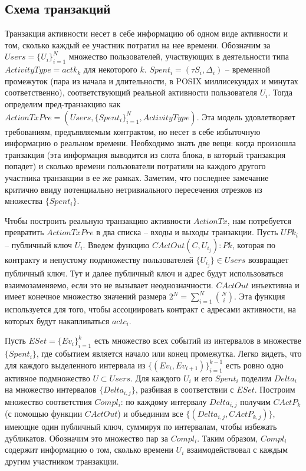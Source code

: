 \documentclass[specification,annotation]{itmo-student-thesis}
\begin{document}
\subsection{Схема транзакций}

Транзакция активности несет в себе информацию об одном виде активности
и том, сколько каждый ее участник потратил на нее времени. Обозначим
за $Users = \{U_i\}_{i=1}^N$ множество пользователей, участвующих в
деятельности типа $ActivityType = actk_k$ для некоторого $k$. $Spent_i
= (\tau S_i, \Delta_i)$ -- временной промежуток (пара из начала и
длительности, в POSIX миллисекундах и минутах соответственно),
соответствующий реальной активности пользователя $U_i$. Тогда
определим пред-транзакцию как $ActionTxPre = (Users,
\{Spent_i\}_{i=1}^N, ActivityType)$. Эта модель удовлетворяет
требованиям, предъявляемым контрактом, но несет в себе избыточную
информацию о реальном времени. Необходимо знать две вещи: когда
произошла транзакция (эта информация выводится из слота блока, в
который транзакция попадет) и сколько времени пользователи потратили
на каждого другого участника транзакции в ее же рамках. Заметим, что
последнее замечание критично ввиду потенциально нетривиального
пересечения отрезков из множества $\{Spent_i\}$.

Чтобы построить реальную транзакцию активности $ActionTx$, нам
потребуется превратить $ActionTxPre$ в два списка -- входы и выходы
транзакции. Пусть $UPk_i$ -- публичный ключ $U_i$. Введем функцию
$CActOut(C, {U_{i_j}}) : Pk$, которая по контракту и непустому
подмножеству пользователей $\{U_{i_j}\} \in Users$ возвращает
публичный ключ. Тут и далее публичный ключ и адрес будут
использоваться взаимозаменяемо, если это не вызывает
неоднозначности. $CActOut$ инъективна и имеет конечное множество
значений размера $2^N = \sum_{i=1}^N{\binom{N}{i}}$. Эта функция
используется для того, чтобы ассоциировать контракт с адресами
активности, на которых будут накапливаться $actc_i$.

Пусть $ESet = \{Ev_i\}_{i=1}^k$ есть множество всех событий из
интервалов в множестве $\{Spent_i\}$, где событием является начало или
конец промежутка. Легко видеть, что для каждого выделенного интервала
из $\{(Ev_i, Ev_{i+1})\}_{i=1}^{k-1}$ есть ровно одно активное
подмножество $U \subset Users$. Для каждого $U_i$ и его $Spent_i$
поделим $Delta_i$ на множество интервалов $\{Delta_{i,j}\}$, разбивая
в соответствии с $ESet$. Построим множество соответствия $Compl_i$: по
каждому интервалу $Delta_{i,j}$ получим $CActP_k$ (с помощью функции
$CActOut$) и объединим все $\{(Delta_{i,j}, CActP_{k,j})\}$, имеющие
один публичный ключ, суммируя по интервалам, чтобы избежать
дубликатов. Обозначим это множество пар за $Compl_i$. Таким образом,
$Compl_i$ содержит информацию о том, сколько времени $U_i$
взаимодействовал с каждым другим участником транзакции.
\end{document}
